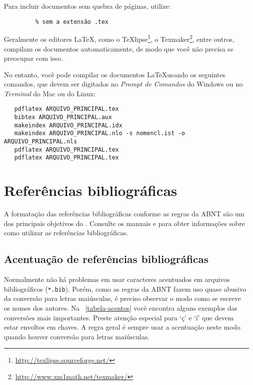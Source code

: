 Para incluir documentos sem quebra de páginas, utilize:

\begin{verbatim}
         % sem a extensão .tex
\end{verbatim}

Geralmente os editores \LaTeX, como o
TeXlipse\footnote{\url{http://texlipse.sourceforge.net/}}, o
Texmaker\footnote{\url{http://www.xm1math.net/texmaker/}}, entre outros,
compilam os documentos automaticamente, de modo que você não precisa se
preocupar com isso.

No entanto, você pode compilar os documentos \LaTeX usando os seguintes
comandos, que devem ser digitados no \emph{Prompt de Comandos} do Windows ou no
\emph{Terminal} do Mac ou do Linux:

\begin{verbatim}
   pdflatex ARQUIVO_PRINCIPAL.tex
   bibtex ARQUIVO_PRINCIPAL.aux
   makeindex ARQUIVO_PRINCIPAL.idx 
   makeindex ARQUIVO_PRINCIPAL.nlo -s nomencl.ist -o ARQUIVO_PRINCIPAL.nls
   pdflatex ARQUIVO_PRINCIPAL.tex
   pdflatex ARQUIVO_PRINCIPAL.tex
\end{verbatim}

\section{Referências bibliográficas}

A formatação das referências bibliográficas conforme as regras da ABNT são um
dos principais objetivos do \abnTeX. Consulte os manuais
 e  para obter informações
sobre como utilizar as referências bibliográficas.

\subsection{Acentuação de referências bibliográficas}

Normalmente não há problemas em usar caracteres acentuados em arquivos
bibliográficos (\texttt{*.bib}). Porém, como as regras da ABNT fazem uso quase
abusivo da conversão para letras maiúsculas, é preciso observar o modo como se
escreve os nomes dos autores. Na ~\autoref{tabela-acentos} você encontra alguns
exemplos das conversões mais importantes. Preste atenção especial para `ç' e `í'
que devem estar envoltos em chaves. A regra geral é sempre usar a acentuação
neste modo quando houver conversão para letras maiúsculas.

